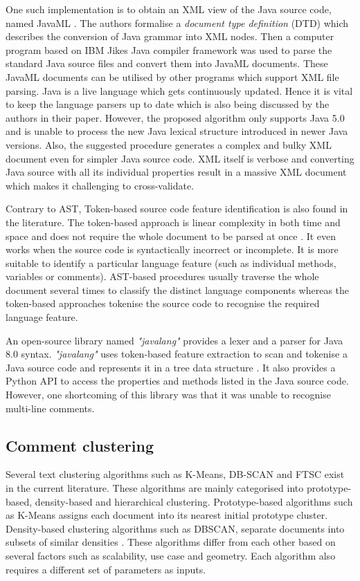 \documentclass[conference]{IEEEtran}
\begin{document}
One such implementation is to obtain an XML view of the Java source code, named JavaML \cite{BADROS2000159}. The authors formalise a \textit{document type definition} (DTD) which describes the conversion of Java grammar into XML nodes. Then a computer program based on IBM Jikes Java compiler framework \cite{ibm-jikes} was used to parse the standard Java source files and convert them into JavaML documents. These JavaML documents can be utilised by other programs which support XML file parsing. Java is a live language which gets continuously updated. Hence it is vital to keep the language parsers up to date which is also being discussed by the authors in their paper. However, the proposed algorithm only supports Java 5.0 and is unable to process the new Java lexical structure introduced in newer Java versions. Also, the suggested procedure generates a complex and bulky XML document even for simpler Java source code. XML itself is verbose and converting Java source with all its individual properties result in a massive XML document which makes it challenging to cross-validate. 

Contrary to AST, Token-based source code feature identification is also found in the literature. The token-based approach is linear complexity in both time and space and does not require the whole document to be parsed at once \cite{4023995}. It even works when the source code is syntactically incorrect or incomplete. It is more suitable to identify a particular language feature (such as individual methods, variables or comments). AST-based procedures usually traverse the whole document several times to classify the distinct language components whereas the token-based approaches tokenise the source code to recognise the required language feature. 

An open-source library named \textit{"javalang"} provides a lexer and a parser for Java 8.0 syntax. \textit{"javalang"} uses token-based feature extraction to scan and tokenise a Java source code and represents it in a tree data structure \cite{java-lang}. It also provides a Python API to access the properties and methods listed in the Java source code. However, one shortcoming of this library was that it was unable to recognise multi-line comments. 
 
\subsection{Comment clustering}

Several text clustering algorithms such as K-Means, DB-SCAN and FTSC exist in the current literature. These algorithms are mainly categorised into prototype-based, density-based and hierarchical clustering. Prototype-based algorithms such as K-Means assigns each document into its nearest initial prototype cluster. Density-based clustering algorithms such as DBSCAN, separate documents into subsets of similar densities \cite{5659055}. These algorithms differ from each other based on several factors such as scalability, use case and geometry. Each algorithm also requires a different set of parameters as inputs. 
\end{document}
